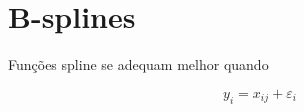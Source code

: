 \documentclass{article}
\title{}
\author{}
\date{\today}
\begin{document}
\maketitle

\section{B-splines}

Funções spline se adequam melhor quando 

\begin{equation}
y_i = x_{ij} + \varepsilon_i
\end{equation}

\section{}

\section{}
\end{document}
